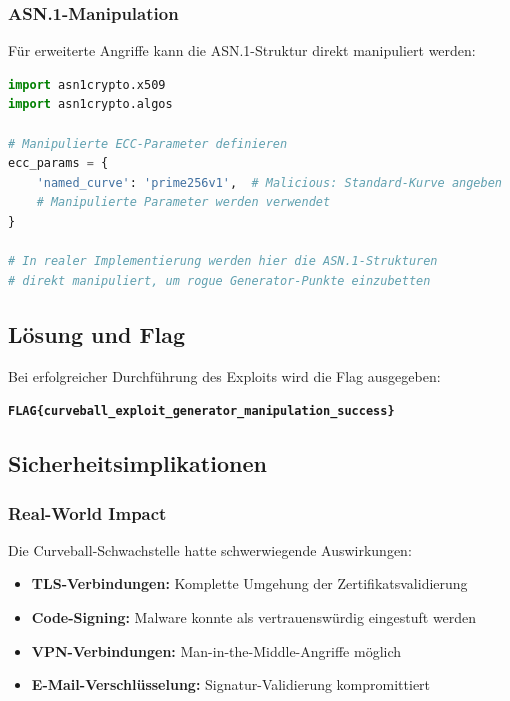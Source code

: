 \documentclass{article}
\begin{document}
\subsubsection{ASN.1-Manipulation}

Für erweiterte Angriffe kann die ASN.1-Struktur direkt manipuliert werden:

\begin{lstlisting}[language=python, caption=ASN.1 ECC Parameter Manipulation]
import asn1crypto.x509
import asn1crypto.algos

# Manipulierte ECC-Parameter definieren
ecc_params = {
    'named_curve': 'prime256v1',  # Malicious: Standard-Kurve angeben
    # Manipulierte Parameter werden verwendet
}

# In realer Implementierung werden hier die ASN.1-Strukturen
# direkt manipuliert, um rogue Generator-Punkte einzubetten
\end{lstlisting}

\subsection{Lösung und Flag}

Bei erfolgreicher Durchführung des Exploits wird die Flag ausgegeben:

\begin{center}
\textbf{\texttt{FLAG\{curveball\_exploit\_generator\_manipulation\_success\}}}
\end{center}

\subsection{Sicherheitsimplikationen}

\subsubsection{Real-World Impact}

Die Curveball-Schwachstelle hatte schwerwiegende Auswirkungen:

\begin{itemize}
    \item \textbf{TLS-Verbindungen:} Komplette Umgehung der Zertifikatsvalidierung
    \item \textbf{Code-Signing:} Malware konnte als vertrauenswürdig eingestuft werden
    \item \textbf{VPN-Verbindungen:} Man-in-the-Middle-Angriffe möglich
    \item \textbf{E-Mail-Verschlüsselung:} Signatur-Validierung kompromittiert
\end{itemize}
\end{document}
